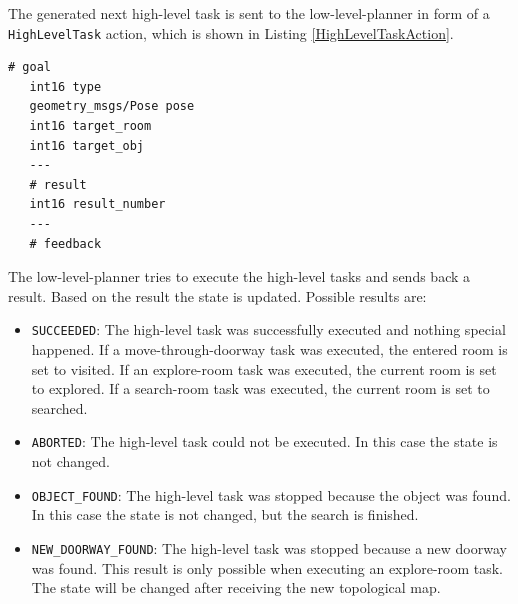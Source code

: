 The generated next high-level task is sent to the low-level-planner in form of a \texttt{HighLevelTask} action, which is shown in Listing \ref{HighLevelTaskAction}. 

\begin{minipage}{\linewidth}
\begin{lstlisting}[caption=HighLevelTask,frame=single, label=HighLevelTaskAction]
   # goal
   int16 type
   geometry_msgs/Pose pose
   int16 target_room
   int16 target_obj
   ---
   # result
   int16 result_number 
   ---
   # feedback

\end{lstlisting}
\end{minipage}

The low-level-planner tries to execute the high-level tasks and sends back a result. Based on the result the state is updated. Possible results are:
\begin{itemize}
 \item \texttt{SUCCEEDED}: The high-level task was successfully executed and nothing special happened. If a move-through-doorway task was executed, the entered room is set to visited. If an explore-room task was executed, the current room is set to explored. If a search-room task was executed, the current room is set to searched. 
 \item \texttt{ABORTED}: The high-level task could not be executed. In this case the state is not changed.
 \item \texttt{OBJECT{\_}FOUND}: The high-level task was stopped because the object was found. In this case the state is not changed, but the search is finished.
 \item \texttt{NEW{\_}DOORWAY{\_}FOUND}: The high-level task was stopped because a new doorway was found. This result is only possible when executing an explore-room task. The state will be changed after receiving the new topological map.
\end{itemize}
